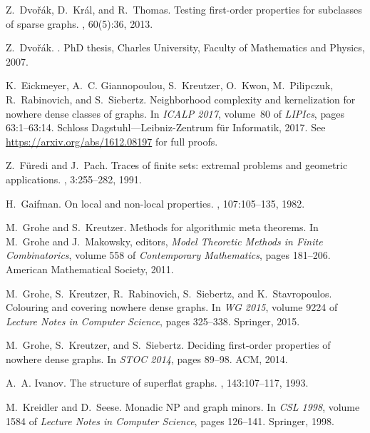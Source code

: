 \documentclass[11pt, fleqn]{article}
\theoremstyle{plain}
\theoremstyle{nonumberplain}
\begin{document}
\begin{thebibliography}{10}
Z.~Dvo{\v{r}}{\'a}k, D.~Kr{\'a}l, and R.~Thomas.
\newblock Testing first-order properties for subclasses of sparse graphs.
, 60(5):36, 2013.

Z.~Dvo\v{r}{\'a}k.
.
\newblock PhD thesis, Charles University, Faculty of Mathematics and Physics,
  2007.

K.~Eickmeyer, A.~C. Giannopoulou, S.~Kreutzer, O.~Kwon, M.~Pilipczuk,
  R.~Rabinovich, and S.~Siebertz.
\newblock Neighborhood complexity and kernelization for nowhere dense classes
  of graphs.
\newblock In {\em {ICALP 2017}}, volume~80 of {\em LIPIcs}, pages 63:1--63:14.
  Schloss Dagstuhl---Leibniz-Zentrum f\"ur Informatik, 2017.
\newblock See \url{https://arxiv.org/abs/1612.08197} for full proofs.

Z.~F{\"u}redi and J.~Pach.
\newblock Traces of finite sets: extremal problems and geometric applications.
, 3:255--282, 1991.

H.~Gaifman.
\newblock On local and non-local properties.
,
  107:105--135, 1982.

M.~Grohe and S.~Kreutzer.
\newblock Methods for algorithmic meta theorems.
\newblock In M.~Grohe and J.~Makowsky, editors, {\em Model Theoretic Methods in
  Finite Combinatorics}, volume 558 of {\em Contemporary Mathematics}, pages
  181--206. American Mathematical Society, 2011.

M.~Grohe, S.~Kreutzer, R.~Rabinovich, S.~Siebertz, and K.~Stavropoulos.
\newblock Colouring and covering nowhere dense graphs.
\newblock In {\em {WG 2015}}, volume 9224 of {\em Lecture Notes in Computer
  Science}, pages 325--338. Springer, 2015.

M.~Grohe, S.~Kreutzer, and S.~Siebertz.
\newblock Deciding first-order properties of nowhere dense graphs.
\newblock In {\em STOC 2014}, pages 89--98. ACM, 2014.

A.~A. Ivanov.
\newblock The structure of superflat graphs.
, 143:107--117, 1993.

M.~Kreidler and D.~Seese.
\newblock Monadic {NP} and graph minors.
\newblock In {\em {CSL 1998}}, volume 1584 of {\em Lecture Notes in Computer
  Science}, pages 126--141. Springer, 1998.


\end{thebibliography}
\end{document}
